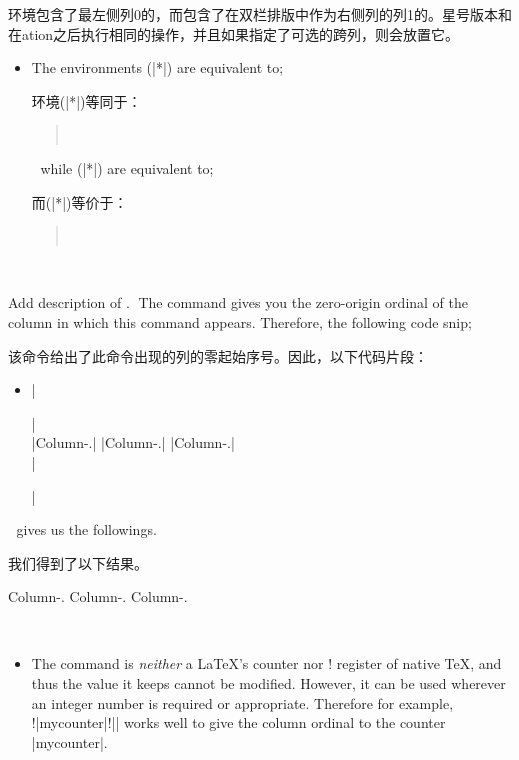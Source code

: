 \begin{description}
环境包含了最左侧列0的，而包含了在双栏排版中作为右侧列的列1的。星号版本和在\sync{}ation之后执行相同的操作，并且如果指定了可选的跨列，则会放置它。


\begin{itemize}
\item
The environments (|*|) are equivalent to;

环境(|*|)等同于：

\begin{quote}
\\
\end{quote}

while (|*|) are equivalent to;

而(|*|)等价于：

\begin{quote}
\\
\end{quote}

\end{itemize}



\item[\Midx{\!\thecolumn!}]\mbox{}\par
{}
{Add description of .}
The command gives you the zero-origin ordinal of the column in which this
command appears.  Therefore, the following code snip;

该命令给出了此命令出现的列的零起始序号。因此，以下代码片段：
\begin{itemize}\item[]
|\begin{paracol}{3}|\\
|Column-\thecolumn.\switchcolumn|
|Column-\thecolumn.\switchcolumn|
|Column-\thecolumn.|\\
|\end{paracol}|
\end{itemize}

gives us the followings.

我们得到了以下结果。

\par\medskip
\begin{paracol}{3}
Column-\thecolumn.\switchcolumn
Column-\thecolumn.\switchcolumn
Column-\thecolumn.
\end{paracol}

\begin{itemize}
\item
The command is {\em neither} a \LaTeX's counter nor \!\count! register of
native \TeX{}, and thus the value it keeps cannot be modified.  However,
it can be used wherever an integer number is required or appropriate.
Therefore for example, \!\setcounter!|{mycounter}{|\!\thecolumn!|}| works
well to give the column ordinal to the counter |mycounter|.


\end{itemize}
\end{description}
